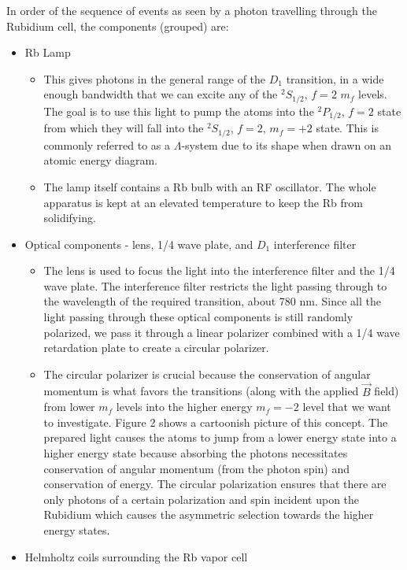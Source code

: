 \documentclass{article}
\newcommand{\twohalfmf}[2]{$^2 #1_{1/2},\, f = 2,\, m_f = #2$}
\newcommand{\twohalf}[1]{$^2 #1_{1/2},\, f = 2$}
\begin{document}
  In order of the sequence of events as seen by a photon travelling through the Rubidium cell, the components (grouped) are:
  \begin{itemize}
    \item Rb Lamp
    \begin{itemize}
      \item This gives photons in the general range of the $D_1$ transition, in a wide enough bandwidth that we can excite any of the \twohalf{S} $m_f$ levels.  The goal is to use this light to pump the atoms into the \twohalf{P} state from which they will fall into the \twohalfmf{S}{+2} state.  This is commonly referred to as a $\Lambda$-system due to its shape when drawn on an atomic energy diagram.
      \item The lamp itself contains a Rb bulb with an RF oscillator.  The whole apparatus is kept at an elevated temperature to keep the Rb from solidifying.
    \end{itemize}
    \item Optical components - lens, 1/4 wave plate, and $D_1$ interference filter
    \begin{itemize}
      \item The lens is used to focus the light into the interference filter and the 1/4 wave plate.  The interference filter restricts the light passing through to the wavelength of the required transition, about 780 nm.  Since all the light passing through these optical components is still randomly polarized, we pass it through a linear polarizer combined with a 1/4 wave retardation plate to create a circular polarizer.
      \item The circular polarizer is crucial because the conservation of angular momentum is what favors the transitions (along with the applied $\vec{B}$ field) from lower $m_f$ levels into the higher energy $m_f = -2$ level that we want to investigate.  Figure 2 shows a cartoonish picture of this concept.  The prepared light causes the atoms to jump from a lower energy state into a higher energy state because absorbing the photons necessitates conservation of angular momentum (from the photon spin) and conservation of energy.  The circular polarization ensures that there are only photons of a certain polarization and spin incident upon the Rubidium which causes the asymmetric selection towards the higher energy states.
    \end{itemize}
    \item Helmholtz coils surrounding the Rb vapor cell
    \begin{itemize}

\end{itemize}
\end{itemize}
\end{document}

